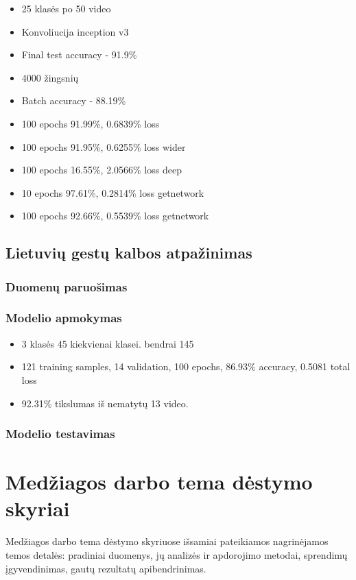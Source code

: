\documentclass{VUMIFPSbakalaurinis}
\begin{document}
\begin{itemize}
	\item 25 klasės po 50 video
	\item Konvoliucija inception v3 
	\item Final test accuracy - 91.9\%
	\item 4000 žingsnių
	\item Batch accuracy - 88.19\%
	\item 100 epochs 91.99\%, 0.6839\% loss
	\item 100 epochs 91.95\%, 0.6255\% loss wider
	\item 100 epochs 16.55\%, 2.0566\% loss deep
	\item 10 epochs 97.61\%, 0.2814\% loss getnetwork
	\item 100 epochs 92.66\%, 0.5539\% loss getnetwork
\end{itemize}

\subsection{Lietuvių gestų kalbos atpažinimas}

\subsubsection{Duomenų paruošimas}
\subsubsection{Modelio apmokymas}

\begin{itemize}
	\item 3 klasės 45 kiekvienai klasei. bendrai 145
	\item 121 training samples, 14 validation, 100 epochs, 86.93\% accuracy, 0.5081 total loss
	\item 92.31\% tikslumas iš nematytų 13 video.
\end{itemize}

\subsubsection{Modelio testavimas}


\section{Medžiagos darbo tema dėstymo skyriai}
Medžiagos darbo tema dėstymo skyriuose išsamiai pateikiamos nagrinėjamos temos
detalės: pradiniai duomenys, jų analizės ir apdorojimo metodai, sprendimų
įgyvendinimas, gautų rezultatų apibendrinimas.
\end{document}
